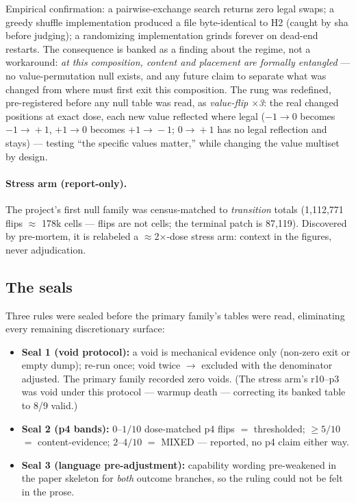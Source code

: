 Empirical confirmation: a pairwise-exchange search returns zero legal
swaps; a greedy shuffle implementation produced a file
byte-identical to H2 (caught by sha before judging); a randomizing
implementation grinds forever on dead-end restarts. The consequence is
banked as a finding about the regime, not a workaround: \emph{at this
composition, content and placement are formally entangled} --- no
value-permutation null exists, and any future claim to separate what
was changed from where must first exit this composition. The rung was
redefined, pre-registered before any null table was read, as
\emph{value-flip $\times$3}: the real changed positions at exact dose,
each new value reflected where legal ($-1\!\to\!0$ becomes
$-1\!\to\!+1$, $+1\!\to\!0$ becomes $+1\!\to\!-1$;
$0\!\to\!+1$ has no legal reflection and stays) --- testing ``the
specific values matter,'' while changing the value multiset by design.

\paragraph{Stress arm (report-only).}
The project's first null family was census-matched to
\emph{transition} totals (1{,}112{,}771 flips $\approx$ 178k cells ---
flips are not cells; the terminal patch is 87{,}119). Discovered by
pre-mortem, it is relabeled a $\approx$2$\times$-dose stress arm:
context in the figures, never adjudication.

\subsection{The seals}
\label{sec:seals}

Three rules were sealed before the primary family's tables were read,
eliminating every remaining discretionary surface:
\begin{itemize}
\item \textbf{Seal 1 (void protocol):} a void is mechanical evidence
  only (non-zero exit or empty dump); re-run once; void twice
  $\to$ excluded with the denominator adjusted. The primary family
  recorded zero voids. (The stress arm's r10--p3 was void under this
  protocol --- warmup death --- correcting its banked table to 8/9
  valid.)
\item \textbf{Seal 2 (p4 bands):} $0$--$1/10$ dose-matched p4 flips
  $=$ thresholded; $\ge 5/10$ $=$ content-evidence; $2$--$4/10$ $=$
  MIXED --- reported, no p4 claim either way.
\item \textbf{Seal 3 (language pre-adjustment):} capability wording
  pre-weakened in the paper skeleton for \emph{both} outcome branches,
  so the ruling could not be felt in the prose.
\end{itemize}

